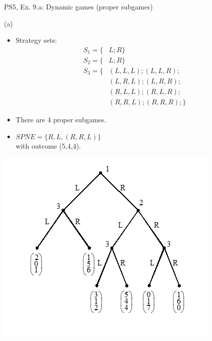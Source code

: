 \begin{frame}{PS5, Ex. 9.a: Dynamic games (proper subgames)}
  \begin{multicols}{2}
    (a)
    \begin{itemize}
      \item Strategy sets:
      \begin{align*}
        S_1=\{&L;R\}\\
        S_2=\{&L;R\}\\
        S_3=\{&(L,L,L);(L,L,R);\\
              &(L,R,L);(L,R,R);\\
              &(R,L,L);(R,L,R);\\
              &(R,R,L);(R,R,R);\}
      \end{align*}
      \item There are 4 proper subgames.
      \item $SPNE=\{R,L,(R,R,L)\}$ \\
            with outcome (5,4,4).
    \end{itemize}
    \vfill\null \columnbreak
    \includegraphics[width=1.2\columnwidth]{figures/Set_5_figure_1}
    \vfill\null
  \end{multicols}
\end{frame}

